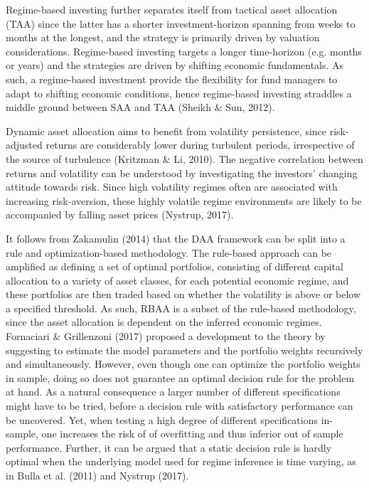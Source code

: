 Regime-based investing further separates itself from tactical asset allocation (TAA) since the latter has a shorter investment-horizon spanning from weeks to months at the longest, and the strategy is primarily driven by valuation considerations. Regime-based investing targets a longer time-horizon (e.g. months or years) and the strategies are driven by shifting economic fundamentals. As such, a regime-based investment provide the flexibility for fund managers to adapt to shifting economic conditions, hence regime-based investing straddles a middle ground between SAA and TAA (Sheikh \& Sun, 2012).

Dynamic asset allocation aims to benefit from volatility persistence, since risk-adjusted returns are considerably lower during turbulent periods, irrespective of the source of turbulence (Kritzman \& Li, 2010). The negative correlation between returns and volatility can be understood by investigating the investors' changing attitude towards risk. Since high volatility regimes often are associated with increasing risk-aversion, these highly volatile regime environments are likely to be accompanied by falling asset prices (Nystrup, 2017).

It follows from Zakamulin (2014) that the DAA framework can be split into a rule and optimization-based methodology. The rule-based approach can be amplified as defining a set of optimal portfolios, consisting of different capital allocation to a variety of asset classes, for each potential economic regime, and these portfolios are then traded based on whether the volatility is above or below a specified threshold. As such, RBAA is a subset of the rule-based methodology, since the asset allocation is dependent on the inferred economic regimes. Fornaciari \& Grillenzoni (2017) proposed a development to the theory by suggesting to estimate the model parameters and the portfolio weights recursively and simultaneously. However, even though one can optimize the portfolio weights in sample, doing so does not guarantee an optimal decision rule for the problem at hand. As a natural consequence a larger number of different specifications might have to be tried, before a decision rule with satisfactory performance can be uncovered. Yet, when testing a high degree of different specifications in-sample, one increases the risk of of overfitting and thus inferior out of sample performance. Further, it can be argued that a static decision rule is hardly optimal when the underlying model used for regime inference is time varying, as in Bulla et al. (2011) and Nystrup (2017).

